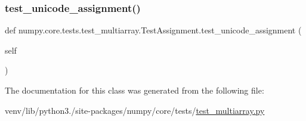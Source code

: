\mbox{\label{classnumpy_1_1core_1_1tests_1_1test__multiarray_1_1TestAssignment_a3bf7cc70764b59cf1f84950f66afecaa}} 
\subsubsection{\texorpdfstring{test\+\_\+unicode\+\_\+assignment()}{test\_unicode\_assignment()}}
{\footnotesize\ttfamily def numpy.\+core.\+tests.\+test\+\_\+multiarray.\+Test\+Assignment.\+test\+\_\+unicode\+\_\+assignment (\begin{DoxyParamCaption}\item[{}]{self }\end{DoxyParamCaption})}



The documentation for this class was generated from the following file\+:\begin{DoxyCompactItemize}
\item 
venv/lib/python3./site-\/packages/numpy/core/tests/\hyperlink{core_2tests_2test__multiarray_8py}{test\+\_\+multiarray.\+py}\end{DoxyCompactItemize}
